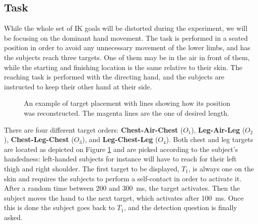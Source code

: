 \subsection{Task}
\label{sec:task}
While the whole set of IK goals will be distorted during the experiment, we will be focusing on the dominant hand movement. The task is performed in a seated position in order to avoid any unnecessary movement of the lower limbs, and has the subjects reach three targets. One of them may be in the air in front of them, while the starting and finishing location is the same relative to their skin. The reaching task is performed with the directing hand, and the subjects are instructed to keep their other hand at their side.

\begin{figure}
    \caption{An example of target placement with lines showing how its position was reconstructed. The magenta lines are the one of desired length.}\label{fig:targetPlacement}
\end{figure}

There are four different target orders: \textbf{Chest-Air-Chest} ($O_1$), \textbf{Leg-Air-Leg} ($O_2$), \textbf{Chest-Leg-Chest} ($O_3$), and \textbf{Leg-Chest-Leg} ($O_4$). Both chest and leg targets are located as depicted on Figure \ref{fig:targetPlacement} and are picked according to the subject's handedness: left-handed subjects for instance will have to reach for their left thigh and right shoulder. The first target to be displayed, $T_1$, is always one on the skin and requires the subjects to perform a self-contact in order to activate it. After a random time between \num{200} and \SI{300}{\milli\second}, the target activates. Then the subject moves the hand to the next target, which activates after \SI{100}{\milli\second}. Once this is done the subject goes back to $T_1$, and the detection question is finally asked.


